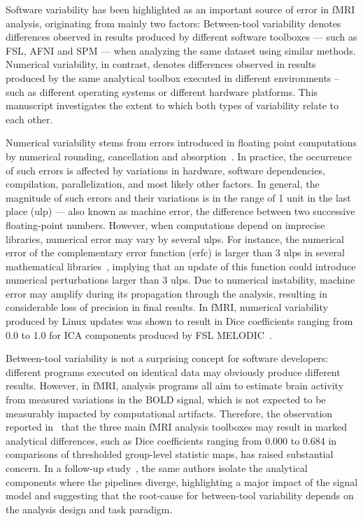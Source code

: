 \documentclass[11pt,onecolumn]{article}
\begin{document}
Software variability has been highlighted as an important source of error
in fMRI analysis, originating from mainly two factors: Between-tool
variability denotes differences observed in results produced by different
software toolboxes --- such as FSL, AFNI and SPM --- when analyzing the same dataset
using similar methods. Numerical variability, in contrast, denotes
differences observed in results produced by the same analytical toolbox
executed in different environments – such as different operating systems or
different hardware platforms. This manuscript investigates the extent to
which both types of variability relate to each other.

Numerical variability stems from errors introduced in floating point
computations by numerical rounding, cancellation and absorption~\cite{muller2018handbook}. In
practice, the occurrence of such errors is affected by variations in
hardware, software dependencies, compilation, parallelization, and most
likely other factors. In general, the magnitude of such errors and their
variations is in the range of 1 unit in the last place (ulp) --- also known
as machine error, the difference between two successive floating-point
numbers. However, when computations depend on imprecise libraries,
numerical error may vary by several ulps. For instance, the numerical error
of the complementary error function (erfc) is larger than 3 ulps in several
mathematical libraries~\cite{zimmermann:hal-03141101}, implying that an update of this function could introduce
numerical perturbations larger than 3 ulps. Due to numerical instability,
machine error may amplify during its propagation through the analysis,
resulting in considerable loss of precision in final results. In fMRI,
numerical variability produced by Linux updates was shown to result in Dice
coefficients ranging from 0.0 to 1.0 for ICA components produced by FSL
MELODIC~\cite{Glatard2015}.

Between-tool variability is not a surprising concept for software
developers: different programs executed on identical data may obviously
produce different results. However, in fMRI, analysis programs all aim to
estimate brain activity from measured variations in the BOLD signal, which
is not expected to be measurably impacted by computational artifacts.
Therefore, the observation reported in~\cite{bowring2019exploring} that the three
main fMRI analysis toolboxes may result in marked
analytical differences, such as Dice coefficients ranging from 0.000 to
0.684 in comparisons of thresholded group-level statistic maps, has raised
substantial concern. In a follow-up study~\cite{bowring2021isolating}, the same
authors isolate the analytical components where the pipelines diverge,
highlighting a major impact of the signal model and suggesting that the
root-cause for between-tool variability depends on the analysis design and
task paradigm.  
\end{document}
